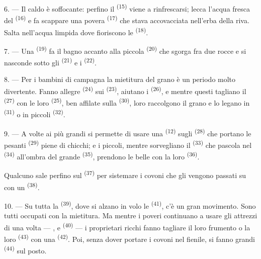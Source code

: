 6. --- Il caldo è soffocante: perfino il  \textsuperscript{(15)} viene a
rinfrescarsi; lecca l'acqua fresca del  \textsuperscript{(16)} e fa
scappare una povera  \textsuperscript{(17)} che stava accovacciata
nell'erba della riva. Salta nell'acqua limpida dove fioriscono le
 \textsuperscript{(18)}.

7. --- Una  \textsuperscript{(19)} fa il bagno accanto alla piccola
 \textsuperscript{(20)} che sgorga fra due rocce e si nasconde sotto
gli  \textsuperscript{(21)} e i 
\textsuperscript{(22)}.

\VUsaut{5.0mm}
\VUsaut{3.4mm}

8. --- Per i bambini di campagna la mietitura del grano è un periodo molto divertente.
Fanno allegre  \textsuperscript{(24)} sui 
\textsuperscript{(23)}, aiutano i  \textsuperscript{(26)}, e mentre
questi tagliano il  \textsuperscript{(27)} con le loro
 \textsuperscript{(25)}, ben affilate sulla 
\textsuperscript{(30)}, loro raccolgono il grano e lo legano in 
\textsuperscript{(31)} o in piccoli  \textsuperscript{(32)}.

9. --- A volte ai più grandi si permette di usare una 
\textsuperscript{(12)} sugli  \textsuperscript{(28)} che portano
le pesanti  \textsuperscript{(29)} piene di chicchi; e i piccoli,
mentre sorvegliano il  \textsuperscript{(33)} che pascola nel
 \textsuperscript{(34)} all'ombra del grande 
\textsuperscript{(35)}, prendono le belle  con la loro 
\textsuperscript{(36)}.

Qualcuno sale perfino sul  \textsuperscript{(37)} per sistemare i covoni
che gli vengono passati su con un  \textsuperscript{(38)}.

10. --- Su tutta la  \textsuperscript{(39)}, dove si alzano in volo le
 \textsuperscript{(41)}, c'è un gran movimento. Sono tutti occupati
con la mietitura. Ma mentre i poveri continuano a usare gli attrezzi di una volta ---
,  e 
\textsuperscript{(40)} --- i proprietari ricchi fanno tagliare il loro frumento o la
loro  \textsuperscript{(43)} con una 
\textsuperscript{(42)}. Poi, senza dover portare i covoni nel fienile, si fanno grandi
 \textsuperscript{(44)} sul posto.


